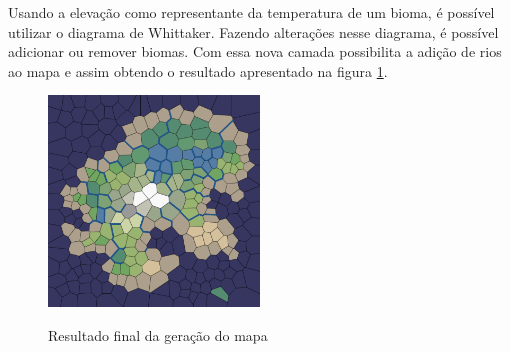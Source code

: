 Usando a elevação como representante da temperatura de um bioma, é possível utilizar o diagrama de Whittaker. Fazendo alterações nesse diagrama, é possível adicionar ou remover biomas. Com essa nova camada possibilita a adição de rios ao mapa \cite{amitp2010} e assim obtendo o resultado apresentado na figura \ref{fig:biomes}.

\begin{figure}[ht]
	\caption{Resultado final da geração do mapa}
	\centering
	\includegraphics[width=0.5\textwidth]{figures/biomes.png}
	\label{fig:biomes}
\end{figure}


